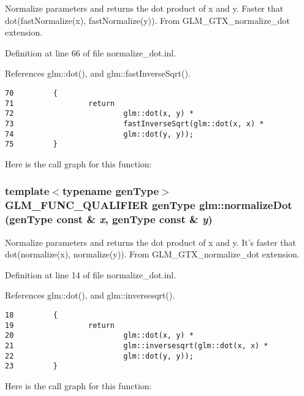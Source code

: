 Normalize parameters and returns the dot product of x and y. Faster that dot(fastNormalize(x), fastNormalize(y)). From GLM\_\-GTX\_\-normalize\_\-dot extension. 

Definition at line 66 of file normalize\_\-dot.inl.

References glm::dot(), and glm::fastInverseSqrt().

\begin{Code}\begin{verbatim}70         {
71                 return 
72                         glm::dot(x, y) * 
73                         fastInverseSqrt(glm::dot(x, x) * 
74                         glm::dot(y, y));
75         }
\end{verbatim}
\end{Code}




Here is the call graph for this function:\hypertarget{group__gtx__normalize__dot_g068b0c92713a438533628dd5d0b581d4}{
\subsubsection[normalizeDot]{\setlength{\rightskip}{0pt plus 5cm}template$<$typename genType$>$ GLM\_\-FUNC\_\-QUALIFIER genType glm::normalizeDot (genType const \& {\em x}, \/  genType const \& {\em y})}}
\label{group__gtx__normalize__dot_g068b0c92713a438533628dd5d0b581d4}


Normalize parameters and returns the dot product of x and y. It's faster that dot(normalize(x), normalize(y)). From GLM\_\-GTX\_\-normalize\_\-dot extension. 

Definition at line 14 of file normalize\_\-dot.inl.

References glm::dot(), and glm::inversesqrt().

\begin{Code}\begin{verbatim}18         {
19                 return 
20                         glm::dot(x, y) * 
21                         glm::inversesqrt(glm::dot(x, x) * 
22                         glm::dot(y, y));
23         }
\end{verbatim}
\end{Code}




Here is the call graph for this function:
